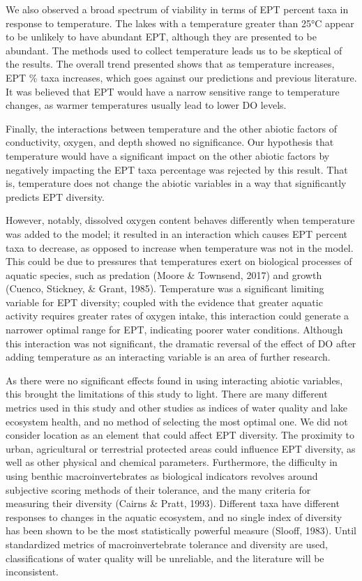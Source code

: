 \documentclass[]{article}
\begin{document}
We also observed a broad spectrum of viability in terms of EPT percent
taxa in response to temperature. The lakes with a temperature greater
than 25°C appear to be unlikely to have abundant EPT, although they are
presented to be abundant. The methods used to collect temperature leads
us to be skeptical of the results. The overall trend presented shows
that as temperature increases, EPT \% taxa increases, which goes against
our predictions and previous literature. It was believed that EPT would
have a narrow sensitive range to temperature changes, as warmer
temperatures usually lead to lower DO levels.

Finally, the interactions between temperature and the other abiotic
factors of conductivity, oxygen, and depth showed no significance. Our
hypothesis that temperature would have a significant impact on the other
abiotic factors by negatively impacting the EPT taxa percentage was
rejected by this result. That is, temperature does not change the
abiotic variables in a way that significantly predicts EPT diversity.

However, notably, dissolved oxygen content behaves differently when
temperature was added to the model; it resulted in an interaction which
causes EPT percent taxa to decrease, as opposed to increase when
temperature was not in the model. This could be due to pressures that
temperatures exert on biological processes of aquatic species, such as
predation (Moore \& Townsend, 2017) and growth (Cuenco, Stickney, \&
Grant, 1985). Temperature was a significant limiting variable for EPT
diversity; coupled with the evidence that greater aquatic activity
requires greater rates of oxygen intake, this interaction could generate
a narrower optimal range for EPT, indicating poorer water conditions.
Although this interaction was not significant, the dramatic reversal of
the effect of DO after adding temperature as an interacting variable is
an area of further research.

As there were no significant effects found in using interacting abiotic
variables, this brought the limitations of this study to light. There
are many different metrics used in this study and other studies as
indices of water quality and lake ecosystem health, and no method of
selecting the most optimal one. We did not consider location as an
element that could affect EPT diversity. The proximity to urban,
agricultural or terrestrial protected areas could influence EPT
diversity, as well as other physical and chemical parameters.
Furthermore, the difficulty in using benthic macroinvertebrates as
biological indicators revolves around subjective scoring methods of
their tolerance, and the many criteria for measuring their diversity
(Cairns \& Pratt, 1993). Different taxa have different responses to
changes in the aquatic ecosystem, and no single index of diversity has
been shown to be the most statistically powerful measure (Slooff, 1983).
Until standardized metrics of macroinvertebrate tolerance and diversity
are used, classifications of water quality will be unreliable, and the
literature will be inconsistent.
\end{document}
